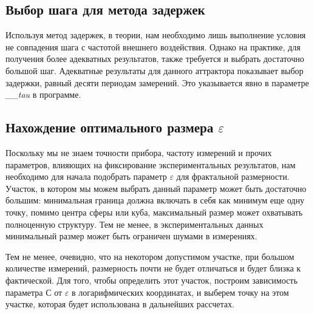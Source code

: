 \documentclass[12pt, oneside, a4paper]{article}
\begin{document}
\subsection{Выбор шага для метода задержек}
Используя метод задержек, в теории, нам необходимо лишь выполнение условия
не совпадения шага с частотой внешнего воздействия. Однако на практике, для
получения более адекватных результатов, также требуется и выбрать достаточно 
большой шаг. Адекватные результаты для данного аттрактора показывает выбор 
задержки, равный десяти периодам замерений. Это указывается явно в параметре 
\textit{\_\_tau} в программе.
\subsection{Нахождение оптимального размера $\varepsilon$}
Поскольку мы не знаем точности прибора, частоту измерений и прочих параметров, 
влияющих на фиксирование экспериментальных результатов, нам необходимо для 
начала подобрать параметр $\varepsilon$ для фрактальной размерности. Участок, в 
котором мы можем выбрать данный параметр может быть достаточно большим:
минимальная граница должна включать в себя как минимум еще одну точку, помимо
центра сферы или куба, максимальный размер может охватывать полноценную 
структуру. Тем не менее, в экспериментальных данных минимальный размер может 
быть ограничен шумами в измерениях.

Тем не менее, очевидно, что на некотором допустимом участке, 
при большом количестве измерений, размерность почти не будет отличаться и 
будет близка к фактической. Для того, чтобы определить этот участок, построим
зависимость параметра С от $\varepsilon$ в логарифмических координатах, и
выберем точку на этом участке, которая будет использована в дальнейших 
рассчетах.
\end{document}
